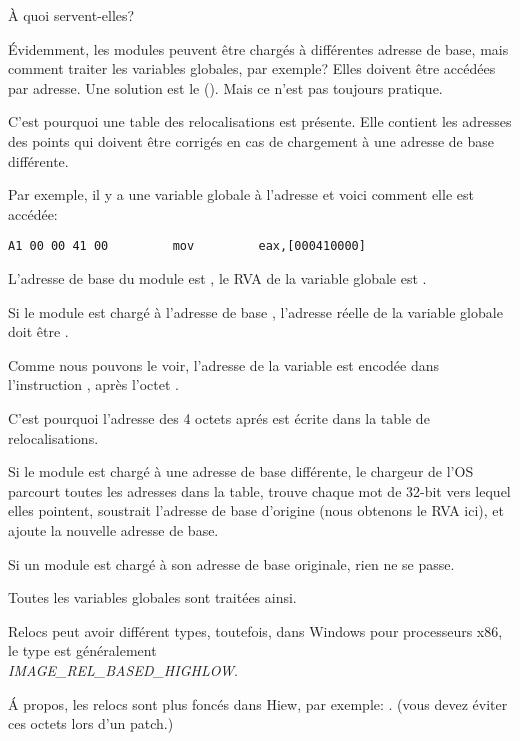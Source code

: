 À quoi servent-elles?

Évidemment, les modules peuvent être chargés à différentes adresse de base, mais
comment traiter les variables globales, par exemple? Elles doivent être accédées
par adresse. Une solution est le \PICcode{} ().
Mais ce n'est pas toujours pratique.

C'est pourquoi une table des relocalisations est présente.
Elle contient les adresses des points qui doivent être corrigés en cas de chargement
à une adresse de base différente.

Par exemple, il y a une variable globale à l'adresse  et voici comment
elle est accédée:

\begin{lstlisting}
A1 00 00 41 00         mov         eax,[000410000]
\end{lstlisting}

L'adresse de base du module est , le \ac{RVA} de la variable globale est
.

Si le module est chargé à l'adresse de base , l'adresse réelle de la
variable globale doit être .


Comme nous pouvons le voir, l'adresse de la variable est encodée dans l'instruction
, après l'octet .

C'est pourquoi l'adresse des 4 octets aprés  est écrite dans la table de
relocalisations.

Si le module est chargé à une adresse de base différente, le chargeur de l'\ac{OS}
parcourt toutes les adresses dans la table, trouve chaque mot de 32-bit vers lequel
elles pointent, soustrait l'adresse de base d'origine (nous obtenons le \ac{RVA} ici),
et ajoute la nouvelle adresse de base.

Si un module est chargé à son adresse de base originale, rien ne se passe.

Toutes les variables globales sont traitées ainsi.

Relocs peut avoir différent types, toutefois, dans Windows pour processeurs x86, le type est généralement \\
\emph{IMAGE\_REL\_BASED\_HIGHLOW}.

Á propos, les relocs sont plus foncés dans Hiew, par exemple: .
(vous devez éviter ces octets lors d'un patch.)

